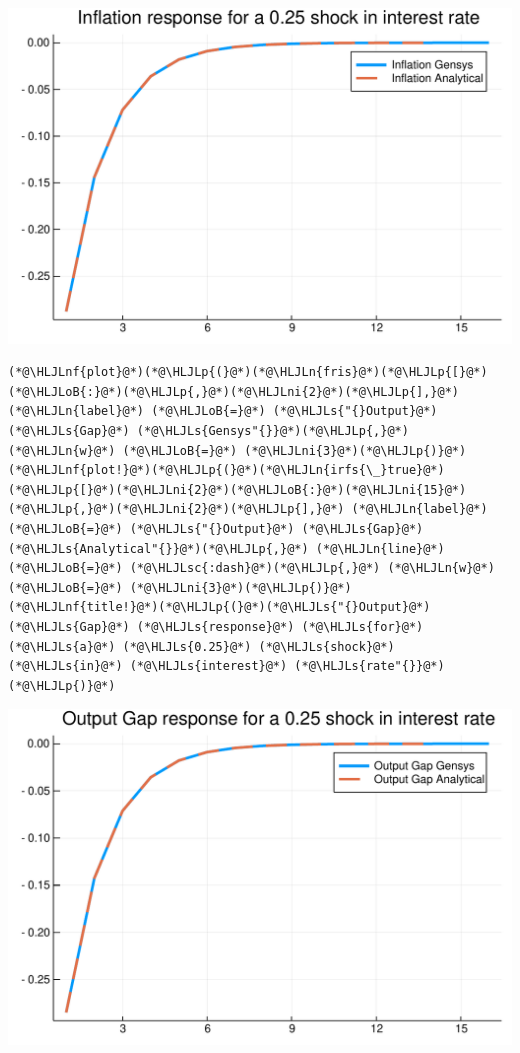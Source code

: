 \documentclass[12pt,a4paper]{article}
\newcommand{\HLJLn}[1]{#1}
\newcommand{\HLJLnf}[1]{\textcolor[RGB]{66,102,213}{#1}}
\newcommand{\HLJLs}[1]{\textcolor[RGB]{201,61,57}{#1}}
\newcommand{\HLJLsc}[1]{\textcolor[RGB]{201,61,57}{#1}}
\newcommand{\HLJLni}[1]{\textcolor[RGB]{59,151,46}{#1}}
\newcommand{\HLJLoB}[1]{\textcolor[RGB]{102,102,102}{\textbf{#1}}}
\newcommand{\HLJLp}[1]{#1}
\begin{document}
\includegraphics[width=\linewidth]{figures/gensys_20_1.pdf}

\begin{lstlisting}
(*@\HLJLnf{plot}@*)(*@\HLJLp{(}@*)(*@\HLJLn{fris}@*)(*@\HLJLp{[}@*)(*@\HLJLoB{:}@*)(*@\HLJLp{,}@*)(*@\HLJLni{2}@*)(*@\HLJLp{],}@*) (*@\HLJLn{label}@*) (*@\HLJLoB{=}@*) (*@\HLJLs{"{}Output}@*) (*@\HLJLs{Gap}@*) (*@\HLJLs{Gensys"{}}@*)(*@\HLJLp{,}@*) (*@\HLJLn{w}@*) (*@\HLJLoB{=}@*) (*@\HLJLni{3}@*)(*@\HLJLp{)}@*)
(*@\HLJLnf{plot!}@*)(*@\HLJLp{(}@*)(*@\HLJLn{irfs{\_}true}@*)(*@\HLJLp{[}@*)(*@\HLJLni{2}@*)(*@\HLJLoB{:}@*)(*@\HLJLni{15}@*)(*@\HLJLp{,}@*)(*@\HLJLni{2}@*)(*@\HLJLp{],}@*) (*@\HLJLn{label}@*) (*@\HLJLoB{=}@*) (*@\HLJLs{"{}Output}@*) (*@\HLJLs{Gap}@*) (*@\HLJLs{Analytical"{}}@*)(*@\HLJLp{,}@*) (*@\HLJLn{line}@*) (*@\HLJLoB{=}@*) (*@\HLJLsc{:dash}@*)(*@\HLJLp{,}@*) (*@\HLJLn{w}@*) (*@\HLJLoB{=}@*) (*@\HLJLni{3}@*)(*@\HLJLp{)}@*)
(*@\HLJLnf{title!}@*)(*@\HLJLp{(}@*)(*@\HLJLs{"{}Output}@*) (*@\HLJLs{Gap}@*) (*@\HLJLs{response}@*) (*@\HLJLs{for}@*) (*@\HLJLs{a}@*) (*@\HLJLs{0.25}@*) (*@\HLJLs{shock}@*) (*@\HLJLs{in}@*) (*@\HLJLs{interest}@*) (*@\HLJLs{rate"{}}@*)(*@\HLJLp{)}@*)
\end{lstlisting}

\includegraphics[width=\linewidth]{figures/gensys_21_1.pdf}
\end{document}
